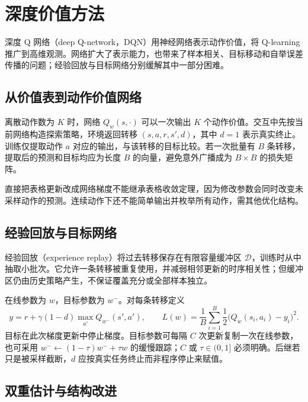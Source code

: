 \setcounter{chapter}{12} %
\chapter{深度价值方法}
\label{ch:rl-dqn}

深度 Q 网络（deep Q-network，DQN）用神经网络表示动作价值，将 Q-learning 推广到高维观测\cite{mnih-dqn}。网络扩大了表示能力，也带来了样本相关、目标移动和自举误差传播的问题；经验回放与目标网络分别缓解其中一部分困难。

\section{从价值表到动作价值网络}

离散动作数为 $K$ 时，网络 $Q_w(s,\cdot)$ 可以一次输出 $K$ 个动作价值。交互中先按当前网络构造探索策略，环境返回转移 $(s,a,r,s',d)$，其中 $d=1$ 表示真实终止。训练仅提取动作 $a$ 对应的输出，与该转移的目标比较。若一次批量有 $B$ 条转移，提取后的预测和目标均应为长度 $B$ 的向量，避免意外广播成为 $B\times B$ 的损失矩阵。

直接把表格更新改成网络梯度不能继承表格收敛定理，因为修改参数会同时改变未采样动作的预测。连续动作下还不能简单输出并枚举所有动作，需其他优化结构。

\section{经验回放与目标网络}

经验回放（experience replay）将过去转移保存在有限容量缓冲区 $\mathcal D$，训练时从中抽取小批次。它允许一条转移被重复使用，并减弱相邻更新的时序相关性；但缓冲区仍由历史策略产生，不保证覆盖充分或全部样本独立。

在线参数为 $w$，目标参数为 $w^-$。对每条转移定义
\begin{equation}
y=r+\gamma(1-d)\max_{a'}Q_{w^-}(s',a'),\qquad
L(w)=\frac1B\sum_{i=1}^B\frac12\bigl(Q_w(s_i,a_i)-y_i\bigr)^2.
\label{eq:rl-dqn-loss}
\end{equation}
目标在此次梯度更新中停止梯度。目标参数可每隔 $C$ 次更新复制一次在线参数，也可采用 $w^-\leftarrow(1-\tau)w^-+\tau w$ 的缓慢跟踪；$C$ 或 $\tau\in(0,1]$ 必须明确。后继若只是被采样截断，$d$ 应按真实任务终止而非程序停止来赋值。

\section{双重估计与结构改进}


